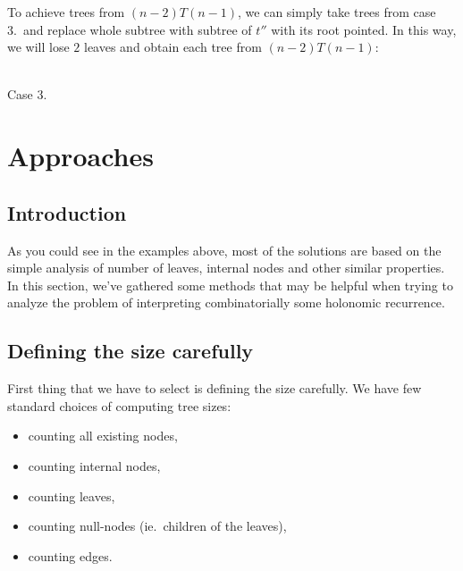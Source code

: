 \documentclass[final]{article}
\theoremstyle{definition}
\theoremstyle{remark}
\begin{document}
To achieve trees from \((n - 2) T(n - 1)\), we can simply take trees from case 3.\ and replace whole subtree with subtree of \(t''\) with its root pointed. In this way, we will lose \(2\) leaves and obtain each tree from \((n - 2) T(n - 1)\):

\begin{center}
    \begin{minipage}[t]{.3\textwidth}
        \begin{center}
            \\
            Case 3.
        \end{center}
    \end{minipage}%
\end{center}

\section{Approaches}%
\label{sec:approaches}

\subsection{Introduction}%
\label{sub:introduction}

As you could see in the examples above, most of the solutions are based on the simple analysis of number of leaves, internal nodes and other similar properties. In this section, we've gathered some methods that may be helpful when trying to analyze the problem of interpreting combinatorially some holonomic recurrence.

\subsection{Defining the size carefully}%
\label{sub:defining_the_size_carefully}

First thing that we have to select is defining the size carefully. We have few standard choices of computing tree sizes:
\begin{itemize}
    \item counting all existing nodes,
    \item counting internal nodes,
    \item counting leaves,
    \item counting null-nodes (ie.\ children of the leaves),
    \item counting edges.
\end{itemize}
\end{document}
